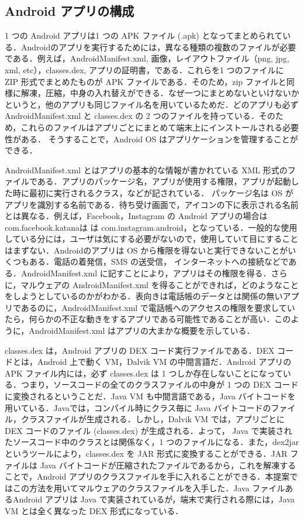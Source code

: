 \documentclass[12pt]{jsarticle}
\begin{document}
\subsection{Android アプリの構成}
\label{sec:andrapp}
1 つの Android アプリは1 つの APK ファイル (.apk) となってまとめられている．Androidのアプリを実行するためには，異なる種類の複数のファイルが必要である．例えば，AndroidManifest.xml, 画像，レイアウトファイル（png, jpg, xml, etc），classes.dex, アプリの証明書，である．これらを1 つのファイルに ZIP 形式でまとめたものが APK ファイルである．そのため，zip ファイルと同様に解凍，圧縮，中身の入れ替えができる．なぜ一つにまとめないといけないかというと，他のアプリも同じファイル名を用いているためだ．どのアプリも必ず AndroidManifest.xml と classes.dex の 2 つのファイルを持っている．そのため，これらのファイルはアプリごとにまとめて端末上にインストールされる必要性がある． そうすることで，Android OS はアプリケーションを管理することができる．

AndroidManifest.xml とはアプリの基本的な情報が書かれている XML 形式のファイルである．アプリのパッケージ名，アプリが使用する権限，アプリが起動した時に最初に実行されるクラス，などが記されている． パッケージ名は OS がアプリを識別する名前である．待ち受け画面で，アイコンの下に表示される名前とは異なる．例えば，Facebook，Instagram の Android アプリの場合は com.facebook.katanaは  は com.instagram.android，となっている．一般的な使用している分には，ユーザは気にする必要がないので，使用していて目にすることはまずない．Androidのアプリは OS から権限を得ないと実行できないことがいくつもある．電話の着発信，SMS の送受信， インターネットへの接続などである．AndroidManifest.xml に記すことにより，アプリはその権限を得る．さらに，マルウェアの AndroidManifest.xml を得ることができれば，どのようなことをしようとしているのかがわかる．表向きは電話帳のデータとは関係の無いアプリであるのに，AndroidManifest.xml で電話帳へのアクセスの権限を要求していたら，何らかの不正な動きをするアプリである可能性であることが高い．このように，AndroidManifest.xml はアプリの大まかな概要を示している．

classes.dex は，Android アプリの DEX コード実行ファイルである．DEX コードとは，Android 上で動く VM，Dalvik VM の中間言語だ．Android アプリの APK ファイル内には，必ず classes.dex は 1 つしか存在しないことになっている．つまり，ソースコードの全てのクラスファイルの中身が 1 つの DEX コードに変換されるということだ．Java VM も中間言語である，Java バイトコードを用いている．Javaでは，コンパイル時にクラス毎に Java バイトコードのファイル，クラスファイルが生成される．しかし，Dalvik VM では，アプリごとに DEX コードのファイル (classes.dex) が生成される．よって， Java で実装されたソースコード中のクラスとは関係なく，1 つのファイルになる．また，dex2jar \cite{d2jar} というツールにより，classes.dex を JAR 形式に変換することができる．JAR ファイルは Java バイトコードが圧縮されたファイルであるから，これを解凍することで，Android アプリのクラスファイルを手に入れることができる．本提案ではこの方法を用いてマルウェアのクラスファイルを入手した．Java ファイルあるAndroid アプリは Java で実装されているが，端末で実行される際には，Java VM とは全く異なった DEX 形式になっている．
\end{document}
